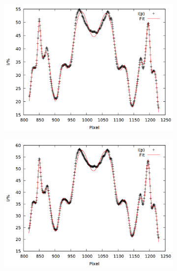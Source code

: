 \begin{figure}
\centering
\begin{subfigure}{0.45\textwidth}
\includegraphics[width=\textwidth]{data/zeeman/out_6_0.png}
\end{subfigure}
\begin{subfigure}{0.45\textwidth}
\includegraphics[width=\textwidth]{data/zeeman/out_6_3.png}
\end{subfigure}
\begin{subfigure}{0.45\textwidth}

\end{subfigure}
\end{figure}

